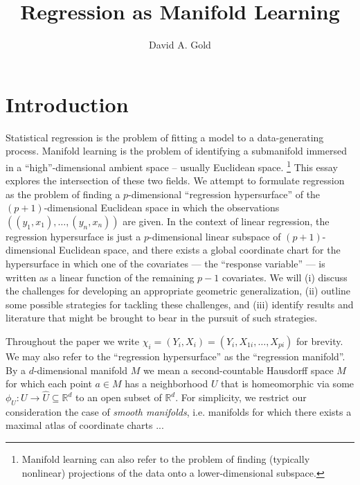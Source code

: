 \documentclass[11pt]{article}
\newcommand{\R}{\ensuremath{\mathbb{R}}}
\newcommand{\bs}[1]{\boldsymbol{#1}}
\numberwithin{equation}{section}
\begin{document}
\newcommand{\X}{\bs{\mathrm{X}}}
\newcommand{\Y}{\bs{\mathrm{Y}}}
\newcommand{\Tr}[1]{{#1}^{\mathrm{T}}}
\newcommand{\obs}{(Y_i, X_i)}
\newcommand{\obsi}{(Y_{i^*}, X_{i^*})}

\title{Regression as Manifold Learning}
\author{David A. Gold}
\maketitle

\section{Introduction}

Statistical regression is the problem of fitting a model to a data-generating process. Manifold learning is the problem of identifying a submanifold immersed in a ``high''-dimensional ambient space -- usually Euclidean space. \footnote{Manifold learning can also refer to the problem of finding (typically nonlinear) projections of the data onto a lower-dimensional subspace.} This essay explores the intersection of these two fields. We attempt to formulate regression as the problem of finding a $p$-dimensional ``regression hypersurface'' of the $(p+1)$-dimensional Euclidean space in which the observations $((y_1, x_1), \ldots, (y_n, x_n))$ are given. In the context of linear regression, the regression hypersurface is just a $p$-dimensional linear subspace of $(p+1)$-dimensional Euclidean space, and there exists a global coordinate chart for the hypersurface in which one of the covariates --- the ``response variable'' --- is written as a linear function of the remaining $p-1$ covariates. We will (i) discuss the challenges for developing an appropriate geometric generalization, (ii) outline some possible strategies for tackling these challenges, and (iii) identify results and literature that might be brought to bear in the pursuit of such strategies. 

Throughout the paper we write $\chi_i = (Y_i, X_i) = (Y_i, X_{1i}, \ldots, X_{pi})$ for brevity. We may also refer to the ``regression hypersurface'' as the ``regression manifold''. By a $d$-dimensional manifold $M$ we mean a second-countable Hausdorff space $M$ for which each point $a \in M$ has a neighborhood $U$ that is homeomorphic via some $\phi_U: U \to \hat{U} \subseteq \R^d$ to an open subset of $\R^d$. For simplicity, we restrict our consideration the case of \emph{smooth manifolds}, i.e. manifolds for which there exists a maximal atlas of coordinate charts ...
\end{document}
